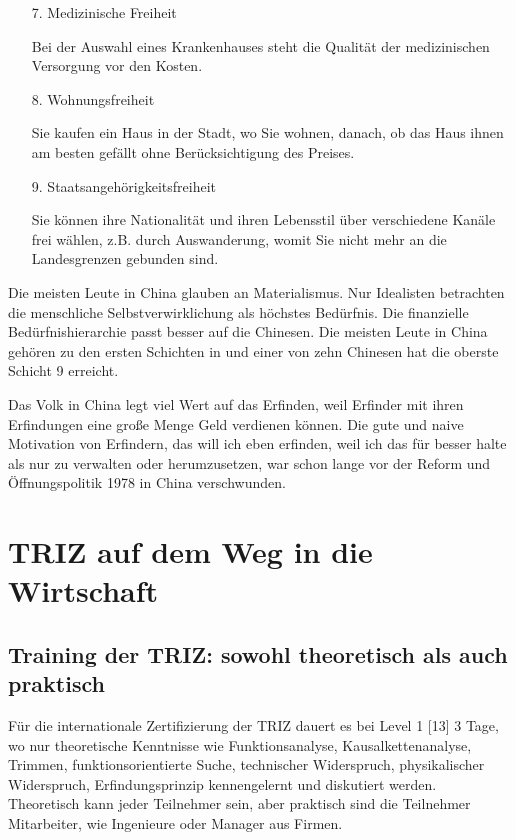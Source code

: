 \documentclass[11pt,a4paper]{article}
\begin{document}
\begin{itemize}
\item[7.] Medizinische Freiheit

Bei der Auswahl eines Krankenhauses steht die Qualität der medizinischen
Versorgung vor den Kosten.

\item[8.] Wohnungsfreiheit

Sie kaufen ein Haus in der Stadt, wo Sie wohnen, danach, ob das Haus ihnen am
besten gefällt ohne Berücksichtigung des Preises.

\item[9.] Staatsangehörigkeitsfreiheit

Sie können ihre Nationalität und ihren Lebensstil über verschiedene Kanäle
frei wählen, z.B. durch Auswanderung, womit Sie nicht mehr an die
Landesgrenzen gebunden sind.
\end{itemize}

Die meisten Leute in China glauben an Materialismus. Nur Idealisten betrachten
die menschliche Selbstverwirklichung als höchstes Bedürfnis. Die finanzielle
Bedürfnishierarchie passt besser auf die Chinesen. Die meisten Leute in China
gehören zu den ersten Schichten in und einer von zehn Chinesen hat die oberste
Schicht 9 erreicht.

Das Volk in China legt viel Wert auf das Erfinden, weil Erfinder mit ihren
Erfindungen eine große Menge Geld verdienen können. Die gute und naive
Motivation von Erfindern, das will ich eben erfinden, weil ich das für besser
halte als nur zu verwalten oder herumzusetzen, war schon lange vor der Reform
und Öffnungspolitik 1978 in China verschwunden.

\section{TRIZ auf dem Weg in die Wirtschaft}

\subsection{Training der TRIZ: sowohl theoretisch als auch praktisch}

Für die internationale Zertifizierung der TRIZ dauert es bei Level 1 [13] 3
Tage, wo nur theoretische Kenntnisse wie Funktionsanalyse,
Kausalkettenanalyse, Trimmen, funktionsorientierte Suche, technischer
Widerspruch, physikalischer Widerspruch, Erfindungsprinzip kennengelernt und
diskutiert werden. Theoretisch kann jeder Teilnehmer sein, aber praktisch sind
die Teilnehmer Mitarbeiter, wie Ingenieure oder Manager aus Firmen.
\end{document}
